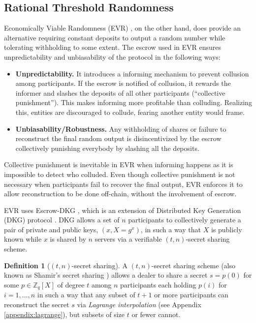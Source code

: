 \documentclass[letterpaper,twocolumn,10pt]{article}
\theoremstyle{definition}
\newtheorem{definition}[theorem]{Definition}
\theoremstyle{remark}
\begin{document}
\subsection{Rational Threshold Randomness}
Economically Viable Randomness (EVR) \cite{david2020economically}, on the other hand, does provide an alternative requiring constant deposits to output a random number while tolerating withholding to some extent. The escrow used in EVR ensures unpredictability and unbiasability of the protocol in the following ways:
\begin{itemize}
    \item \textbf{Unpredictability.} It introduces a informing mechanism to prevent collusion among participants. If the escrow is notified of collusion, it rewards the informer and slashes the deposits of all other participants (``collective punishment''). This makes informing more profitable than colluding. Realizing this, entities are discouraged to collude, fearing another entity would frame.
    \item \textbf{Unbiasability/Robustness.} Any withholding of shares or failure to reconstruct the final random output is disincentivized by the escrow collectively punishing everybody by slashing all the deposits.
\end{itemize}

Collective punishment is inevitable in EVR when informing happens as it is impossible to detect who colluded. Even though collective punishment is not necessary when participants fail to recover the final output, EVR enforces it to allow reconstruction to be done off-chain, without the involvement of escrow. 

EVR uses Escrow-DKG \cite{david2019rational}, which is an extension of Distributed Key Generation (DKG) protocol \cite{gennaro1999secure, gennaro3revisiting}. DKG allows a set of $n$ participants to collectively generate a pair of private and public keys, $(x,X = g^x )$, in such a way that $X$ is publicly known while $x$ is shared by $n$ servers via a verifiable $(t, n)$-secret sharing scheme.

\begin{definition}[$(t, n)$-secret sharing]
A $(t, n)$-secret sharing scheme (also known as Shamir's secret sharing \cite{shamir1979share}) allows a dealer to share a secret $s = p(0)$ for some $p \in \mathbb{Z}_q[X]$ of degree $t$ among $n$ participants each holding $p(i)$ for $i = 1, ..., n$ in such a way that any subset of $t + 1$ or more participants can reconstruct the secret $s$ via \textit{Lagrange interpolation} (see Appendix \ref{appendix:lagrange}), but subsets of size $t$ or fewer cannot.
\end{definition}
\end{document}
